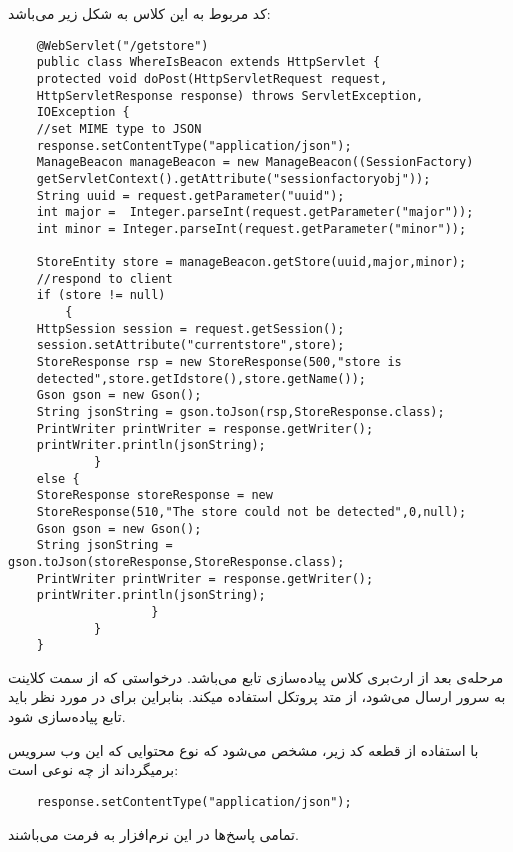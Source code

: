 \documentclass[oneside]{report}
\begin{document}
کد مربوط به این کلاس به شکل زیر می‌باشد: 
\begin{latin}
	\begin{verbatim}
	@WebServlet("/getstore")
	public class WhereIsBeacon extends HttpServlet {
	protected void doPost(HttpServletRequest request, 
	HttpServletResponse response) throws ServletException, 
	IOException {
	//set MIME type to JSON
	response.setContentType("application/json");
	ManageBeacon manageBeacon = new ManageBeacon((SessionFactory) 
	getServletContext().getAttribute("sessionfactoryobj"));
	String uuid = request.getParameter("uuid");
	int major =  Integer.parseInt(request.getParameter("major"));
	int minor = Integer.parseInt(request.getParameter("minor"));
	
	StoreEntity store = manageBeacon.getStore(uuid,major,minor);
	//respond to client
	if (store != null)
		{
	HttpSession session = request.getSession();
	session.setAttribute("currentstore",store);
	StoreResponse rsp = new StoreResponse(500,"store is 
	detected",store.getIdstore(),store.getName());
	Gson gson = new Gson();
	String jsonString = gson.toJson(rsp,StoreResponse.class);
	PrintWriter printWriter = response.getWriter();
	printWriter.println(jsonString);
	      	}
	else {
	StoreResponse storeResponse = new 
	StoreResponse(510,"The store could not be detected",0,null);
	Gson gson = new Gson();
	String jsonString = gson.toJson(storeResponse,StoreResponse.class);
	PrintWriter printWriter = response.getWriter();
	printWriter.println(jsonString);
	               	}
	        }
	}
	\end{verbatim}
\end{latin}
		
\noindent		
مرحله‌ی بعد از ارث‌بری کلاس
{\normalsize{}}
پیاده‌سازی تابع
{\normalsize{}}
می‌باشد. درخواستی که از سمت کلاینت به سرور ارسال می‌شود، از متد 
{\normalsize{}}
پروتکل 
{\normalsize{}}
استفاده میکند. بنابراین برای در 
{\normalsize{}}
مورد نظر باید تابع 
{\normalsize{}}
پیاده‌سازی شود. 

با استفاده از قطعه کد زیر، مشخص می‌شود که نوع محتوایی که این وب سرویس بر‌میگرداند از چه نوعی است:‌
\begin{latin}
\begin{verbatim}
	response.setContentType("application/json");
\end{verbatim}
	
\end{latin}
تمامی پاسخ‌ها در این نرم‌افزار به فرمت
{\normalsize{}}
می‌باشند. 
\end{document}
